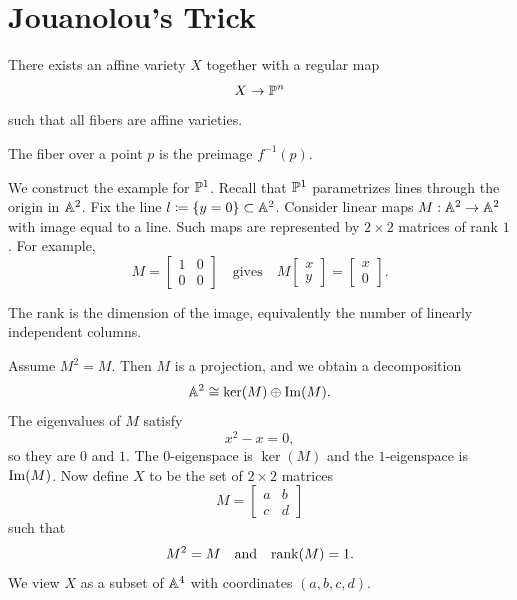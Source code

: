 
\section{Jouanolou's Trick}

\begin{theorem}{
    There exists an affine variety $X$ together with a regular map
    \[
        X \to \pp^n
    \]
    such that all fibers are affine varieties.
}
    \begin{definition}[Fiber]
        The fiber over a point $p$ is the preimage $f^{-1}(p)$.
    \end{definition}
    We construct the example for $\pp^1$.
    Recall that $\pp^1$ parametrizes lines through the origin in $\aa^2$.
    Fix the line $l \coloneqq \{y = 0\}\subset \aa^2$.
    Consider linear maps $M:\aa^2\to\aa^2$ with image equal to a line.
    Such maps are represented by $2\times 2$ matrices of rank $1$.
    For example,
    \[
        M =
        \begin{bmatrix}
            1 & 0\\
            0 & 0
        \end{bmatrix}
        \quad\text{gives}\quad
        M\begin{bmatrix}x\\y\end{bmatrix}
        =
        \begin{bmatrix}x\\0\end{bmatrix}.
    \]
    \begin{definition}[Rank]
        The rank is the dimension of the image, equivalently the number of linearly independent columns.
    \end{definition}
    Assume $M^2 = M$.
    Then $M$ is a projection, and we obtain a decomposition
    \[
        \aa^2 \cong \ker(M)\oplus \ima(M).
    \]
    The eigenvalues of $M$ satisfy
    \[
        x^2 - x = 0,
    \]
    so they are $0$ and $1$.
    The $0$-eigenspace is $\ker(M)$ and the $1$-eigenspace is $\ima(M)$.
    Now define $X$ to be the set of $2\times 2$ matrices
    \[
        M =
        \begin{bmatrix}
            a & b\\
            c & d
        \end{bmatrix}
    \]
    such that
    \[
        M^2 = M \quad\text{and}\quad \rank(M) = 1.
    \]
    We view $X$ as a subset of $\aa^4$ with coordinates $(a,b,c,d)$.

\end{theorem}

